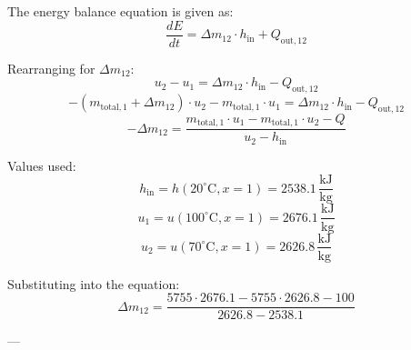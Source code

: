 The energy balance equation is given as:  
\[
\frac{dE}{dt} = \Delta m_{12} \cdot h_{\text{in}} + Q_{\text{out},12}
\]  

Rearranging for \( \Delta m_{12} \):  
\[
u_2 - u_1 = \Delta m_{12} \cdot h_{\text{in}} - Q_{\text{out},12}
\]  
\[
-\left( m_{\text{total},1} + \Delta m_{12} \right) \cdot u_2 - m_{\text{total},1} \cdot u_1 = \Delta m_{12} \cdot h_{\text{in}} - Q_{\text{out},12}
\]  
\[
-\Delta m_{12} = \frac{m_{\text{total},1} \cdot u_1 - m_{\text{total},1} \cdot u_2 - Q}{u_2 - h_{\text{in}}}
\]  

Values used:  
\[
h_{\text{in}} = h(20^\circ\text{C}, x=1) = 2538.1 \, \frac{\text{kJ}}{\text{kg}}
\]  
\[
u_1 = u(100^\circ\text{C}, x=1) = 2676.1 \, \frac{\text{kJ}}{\text{kg}}
\]  
\[
u_2 = u(70^\circ\text{C}, x=1) = 2626.8 \, \frac{\text{kJ}}{\text{kg}}
\]  

Substituting into the equation:  
\[
\Delta m_{12} = \frac{5755 \cdot 2676.1 - 5755 \cdot 2626.8 - 100}{2626.8 - 2538.1}
\]  

---